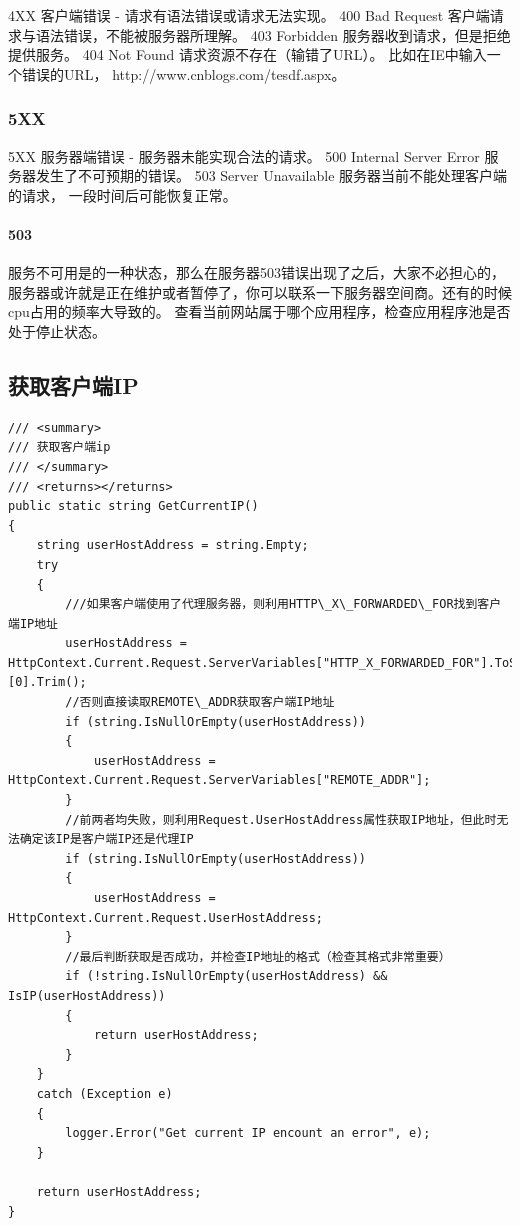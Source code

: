 \documentclass{book}
\begin{document}
4XX  客户端错误 - 请求有语法错误或请求无法实现。
400 Bad Request  客户端请求与语法错误，不能被服务器所理解。
403 Forbidden 服务器收到请求，但是拒绝提供服务。
404 Not Found 请求资源不存在（输错了URL）。
比如在IE中输入一个错误的URL， http://www.cnblogs.com/tesdf.aspx。

\subsubsection{5XX}

5XX  服务器端错误 - 服务器未能实现合法的请求。
500 Internal Server Error 服务器发生了不可预期的错误。
503 Server Unavailable 服务器当前不能处理客户端的请求，
一段时间后可能恢复正常。

\paragraph{503}服务不可用是的一种状态，那么在服务器503错误出现了之后，大家不必担心的， 服务器或许就是正在维护或者暂停了，你可以联系一下服务器空间商。还有的时候cpu占用的频率大导致的。
查看当前网站属于哪个应用程序，检查应用程序池是否处于停止状态。

\subsection{获取客户端IP}

\begin{lstlisting}[language={[Sharp]C}]
/// <summary>
/// 获取客户端ip
/// </summary>
/// <returns></returns>
public static string GetCurrentIP()
{
    string userHostAddress = string.Empty;
    try
    {
        ///如果客户端使用了代理服务器，则利用HTTP\_X\_FORWARDED\_FOR找到客户端IP地址
        userHostAddress = HttpContext.Current.Request.ServerVariables["HTTP_X_FORWARDED_FOR"].ToString().Split(',')[0].Trim();
        //否则直接读取REMOTE\_ADDR获取客户端IP地址
        if (string.IsNullOrEmpty(userHostAddress))
        {
            userHostAddress = HttpContext.Current.Request.ServerVariables["REMOTE_ADDR"];
        }
        //前两者均失败，则利用Request.UserHostAddress属性获取IP地址，但此时无法确定该IP是客户端IP还是代理IP
        if (string.IsNullOrEmpty(userHostAddress))
        {
            userHostAddress = HttpContext.Current.Request.UserHostAddress;
        }
        //最后判断获取是否成功，并检查IP地址的格式（检查其格式非常重要）
        if (!string.IsNullOrEmpty(userHostAddress) && IsIP(userHostAddress))
        {
            return userHostAddress;
        }
    }
    catch (Exception e)
    {
        logger.Error("Get current IP encount an error", e);
    }

    return userHostAddress;
}
\end{lstlisting}
\end{document}
